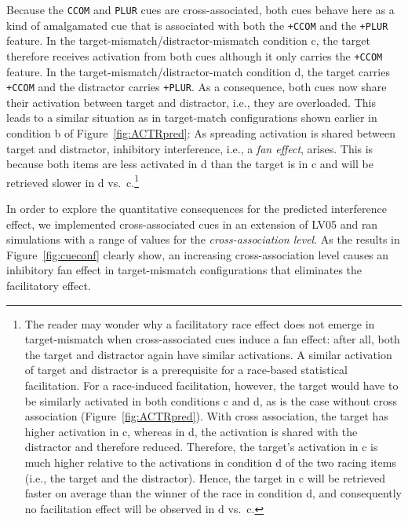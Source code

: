 \documentclass{cambridge7A}\usepackage[]{graphicx}\usepackage[]{color}
\newcommand{\actrcue}[1]{\texttt{\uppercase{#1}}}
\newcommand{\match}[1]{\texttt{+\uppercase{#1}}}
\begin{document}
Because the \actrcue{ccom} and \actrcue{plur} cues are cross-associated, both cues behave here as a kind of amalgamated cue that is associated with both the \match{ccom} and the \match{plur} feature. 
In the target-mismatch/distractor-mismatch condition c, the target therefore receives activation from both cues although it only carries the \match{ccom} feature.
In the target-mismatch/distractor-match condition d, the target carries \match{ccom} and the distractor carries \match{plur}. As a consequence, both cues now share their activation between target and distractor, i.e., they are overloaded. 
This leads to a similar situation as in target-match configurations shown earlier in condition b of Figure~\ref{fig:ACTRpred}: As  spreading activation is shared between target and distractor, inhibitory interference, i.e., a  \emph{fan effect}, arises. This is because both items are less activated in d than the target is in c and will be retrieved slower in d vs.\ c.\footnote{The reader may wonder why a facilitatory race effect does not emerge in target-mismatch when cross-associated cues induce a fan effect: after all, both the target and distractor again have similar activations. A similar activation of target and distractor is   a prerequisite for a race-based statistical facilitation. 
For a race-induced facilitation, however, the target would have to be similarly activated in both conditions c and d, as is the case without cross association (Figure~\ref{fig:ACTRpred}). With cross association, the target has higher activation in c, whereas in d, the activation is shared with the distractor and therefore reduced. Therefore, the target's activation in c is much higher relative to the activations in condition d of the two racing items (i.e., the target and the distractor). Hence, the target in c will be retrieved faster on average than the winner of the race in condition d, and consequently no facilitation effect will be observed in d vs.\ c.} 

In order to explore the quantitative consequences for the predicted interference effect, we implemented cross-associated cues in an extension of LV05 and ran simulations with a range of values for the  \emph{cross-association level}.
As the results in Figure~\ref{fig:cueconf} clearly show, an increasing cross-association level causes an inhibitory fan effect in target-mismatch configurations that eliminates the facilitatory effect.
\end{document}
